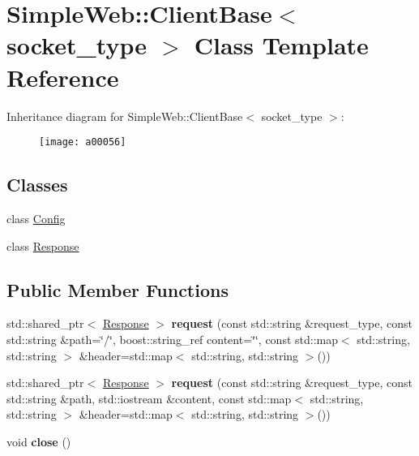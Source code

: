 \hypertarget{a00056}{}\section{Simple\+Web\+:\+:Client\+Base$<$ socket\+\_\+type $>$ Class Template Reference}
\label{a00056}
Inheritance diagram for Simple\+Web\+:\+:Client\+Base$<$ socket\+\_\+type $>$\+:\begin{figure}[H]
\begin{center}
\leavevmode
\texttt{[image: a00056]}
\end{center}
\end{figure}
\subsection*{Classes}
\begin{DoxyCompactItemize}
\item 
class \hyperlink{a00061}{Config}
\item 
class \hyperlink{a00250}{Response}
\end{DoxyCompactItemize}
\subsection*{Public Member Functions}
\begin{DoxyCompactItemize}
\item 
std\+::shared\+\_\+ptr$<$ \hyperlink{a00250}{Response} $>$ {\bfseries request} (const std\+::string \&request\+\_\+type, const std\+::string \&path=\char`\"{}/\char`\"{}, boost\+::string\+\_\+ref content=\char`\"{}\char`\"{}, const std\+::map$<$ std\+::string, std\+::string $>$ \&header=std\+::map$<$ std\+::string, std\+::string $>$())\hypertarget{a00056_ac8a838ace77f0a1a19b8cb03bdba7e74}{}\label{a00056_ac8a838ace77f0a1a19b8cb03bdba7e74}

\item 
std\+::shared\+\_\+ptr$<$ \hyperlink{a00250}{Response} $>$ {\bfseries request} (const std\+::string \&request\+\_\+type, const std\+::string \&path, std\+::iostream \&content, const std\+::map$<$ std\+::string, std\+::string $>$ \&header=std\+::map$<$ std\+::string, std\+::string $>$())\hypertarget{a00056_aca6cb17dbea9adf0cf1daf9d1ea70f76}{}\label{a00056_aca6cb17dbea9adf0cf1daf9d1ea70f76}

\item 
void {\bfseries close} ()\hypertarget{a00056_ad21735a9bda2fae6aedd811efae981e1}{}\label{a00056_ad21735a9bda2fae6aedd811efae981e1}

\end{DoxyCompactItemize}
